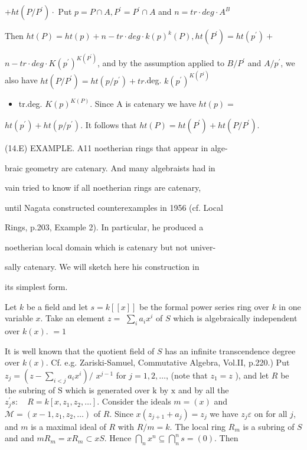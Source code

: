 $+h t\left(P / P^{\prime}\right) \cdot$ Put $p=P \cap A, P^{\prime}=P^{\prime} \cap A$ and $n=t r \cdot d e g \cdot A^{B}$

Then $h t(P)=h t(p)+n-t r \cdot d e g \cdot k(p)^{k}(P), h t\left(P^{\prime}\right)=h t\left(p^{\prime}\right)+$

$n-t r \cdot d e g \cdot K\left(p^{\prime}\right)^{K\left(P^{\prime}\right)}$, and by the assumption applied to $B / P^{\prime}$ and $A / p^{\prime}$, we also have $h t\left(P / P^{\prime}\right)=h t\left(p / p^{\prime}\right)+t r$.deg. $k\left(p^{\prime}\right)^{K\left(P^{\prime}\right)}$

\begin{itemize}
  \item tr.deg. $K(p)^{K(P)}$. Since A is catenary we have $h t(p)=$
\end{itemize}
$h t\left(p^{\prime}\right)+h t\left(p / p^{\prime}\right)$. It follows that $h t(P)=h t\left(P^{\prime}\right)+h t\left(P / P^{\prime}\right)$.

(14.E) EXAMPLE. A11 noetherian rings that appear in alge-

braic geometry are catenary. And many algebraists had in

vain tried to know if all noetherian rings are catenary,

until Nagata constructed counterexamples in 1956 (cf. Local

Rings, p.203, Example 2). In particular, he produced a

noetherian local domain which is catenary but not univer-

sally catenary. We will sketch here his construction in

its simplest form.

Let $k$ be a field and let $s=k[[x]]$ be the formal power series ring over $k$ in one variable $x$. Take an element $z=$ $\sum_{i} a_{i} x^{i}$ of $S$ which is algebraically independent over $k(x)$. $=1$

It is well known that the quotient field of $S$ has an infinite transcendence degree over $k(x)$. Cf. e.g. Zariski-Samuel, Commutative Algebra, Vol.II, p.220.) Put $z_{j}=\left(z-\sum_{i<j} a_{i} x^{i}\right) /$ $x^{j-1}$ for $j=1,2, \ldots$, (note that $z_{1}=z$ ), and let $R$ be the subring of $\mathrm{S}$ which is generated over $\mathrm{k}$ by $\mathrm{x}$ and by all the $z_{j}^{\prime} s: \quad R=k\left[x, z_{1}, z_{2}, \ldots\right]$. Consider the ideals $m=(x)$ and $\mathcal{M}=\left(x-1, z_{1}, z_{2}, \ldots\right)$ of $R$. Since $x\left(z_{j+1}+a_{j}\right)=z_{j}$ we have $z_{j} \varepsilon$ on for all $j$, and $m$ is a maximal ideal of $R$ with $R / m=k$. The local ring $R_{m}$ is a subring of $S$ and and $m R_{m}=x R_{m} \subset x S$. Hence $\bigcap_{n} x^{n} \subseteq \bigcap_{n}^{n} s=(0)$. Then

